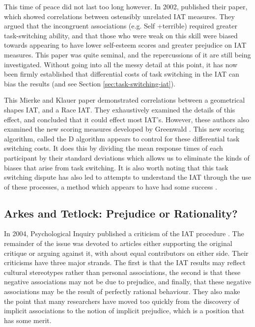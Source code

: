 This time of peace did not last too long however. In 2002, \cite{McFarland2002} published their paper, which showed correlations between ostensibly unrelated IAT measures. They argued that the incongruent associations (e.g. Self +terrible) required greater task-switching ability, and that those who were weak on this skill were biased towards appearing to have lower self-esteem scores and greater prejudice on IAT measures. This paper was quite seminal, and the repercussions of it are still being investigated. Without going into all the messy detail at this point, it has now been firmly established that differential costs of task switching in the IAT can bias the results \cite{Mierke2001,Mierke2003} (and see Section \ref{sec:task-switching-iat}). 

This Mierke and Klauer paper demonstrated correlations between a geometrical shapes IAT, and a Race IAT. They exhaustively examined the details of this effect, and concluded that it could effect most IAT's. However, these authors also examined the new scoring measures developed by Greenwald \cite{Greenwald2003a}. This new scoring algorithm, called the D algorithm appears to control for these differential task switching costs. It does this by dividing the mean response times of each participant by their standard deviations which allows us to eliminate the kinds of biases that arise from task switching. It is also worth noting that this task switching dispute has also led to attempts to understand the IAT through the use of these processes, a method which appears to have had some success \cite{Klauer2005}. 

\subsection{Arkes and Tetlock: Prejudice or Rationality?}
\label{sec:arkes-tetl-prej}

In 2004, Psychological Inquiry published a criticism of the IAT procedure \cite{Arkes2004}. The remainder of the issue was devoted to articles either supporting the original critique or arguing against it, with about equal contributors on either side. Their criticisms have three major strands. The first is that the IAT results may reflect cultural stereotypes rather than personal associations, the second is that these negative associations may not be due to prejudice, and finally, that these negative associations may be the result of perfectly rational behaviour. They also make the point that many researchers have moved too quickly from the discovery of implicit associations to the notion of implicit prejudice, which is a position that has some merit. 

